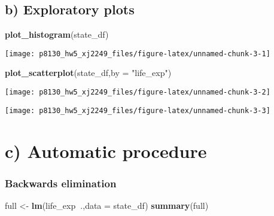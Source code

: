 \documentclass[]{article}
\newenvironment{Shaded}{\begin{snugshade}}{\end{snugshade}}
\newcommand{\DataTypeTok}[1]{\textcolor[rgb]{0.13,0.29,0.53}{#1}}
\newcommand{\KeywordTok}[1]{\textcolor[rgb]{0.13,0.29,0.53}{\textbf{#1}}}
\newcommand{\NormalTok}[1]{#1}
\newcommand{\OperatorTok}[1]{\textcolor[rgb]{0.81,0.36,0.00}{\textbf{#1}}}
\newcommand{\StringTok}[1]{\textcolor[rgb]{0.31,0.60,0.02}{#1}}
\begin{document}
\hypertarget{b-exploratory-plots}{%
\subsection{b) Exploratory plots}\label{b-exploratory-plots}}

\begin{Shaded}
\begin{Highlighting}[]
\KeywordTok{plot_histogram}\NormalTok{(state_df)}
\end{Highlighting}
\end{Shaded}

\texttt{[image: p8130\_hw5\_xj2249\_files/figure-latex/unnamed-chunk-3-1]}

\begin{Shaded}
\begin{Highlighting}[]
\KeywordTok{plot_scatterplot}\NormalTok{(state_df,}\DataTypeTok{by =} \StringTok{"life_exp"}\NormalTok{)}
\end{Highlighting}
\end{Shaded}

\texttt{[image: p8130\_hw5\_xj2249\_files/figure-latex/unnamed-chunk-3-2]}

\begin{Shaded}
\end{Shaded}

\texttt{[image: p8130\_hw5\_xj2249\_files/figure-latex/unnamed-chunk-3-3]}

\hypertarget{c-automatic-procedure}{%
\section{c) Automatic procedure}\label{c-automatic-procedure}}

\hypertarget{backwards-elimination}{%
\subsubsection{Backwards elimination}\label{backwards-elimination}}

\begin{Shaded}
\begin{Highlighting}[]
\NormalTok{full <-}\StringTok{ }\KeywordTok{lm}\NormalTok{(life_exp}\OperatorTok{~}\NormalTok{.,}\DataTypeTok{data =}\NormalTok{ state_df)}
\KeywordTok{summary}\NormalTok{(full)}
\end{Highlighting}
\end{Shaded}
\end{document}
